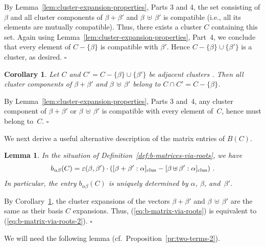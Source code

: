 \documentclass[letterpaper]{amsart}
\numberwithin{equation}{section}
\newtheorem{corollary}[theorem]{Corollary}
\newtheorem{lemma}[theorem]{Lemma}
\theoremstyle{definition}
\def\proof{\smallskip\noindent {\bf Proof.\ }}
\def\endproof{\hfill$\square$\medskip}
\def\subplus{{\,\uplus\,} }
\begin{document}
\proof 
By Lemma~\ref{lem:cluster-expansion-properties}, Parts 3 and 4, 
the set consisting of $\beta$ and all cluster components of 
$\beta + \beta'$ and $\beta \subplus \beta'$ is compatible 
(i.e., all its elements are mutually compatible). 
Thus, there exists a cluster $C$ containing this set. 
Again using Lemma~\ref{lem:cluster-expansion-properties}, Part~4, 
we conclude that every element of $C - \{\beta\}$ is compatible 
with $\beta'$. 
Hence  $C-\{\beta\}\cup\{\beta'\}$ is a cluster, as desired. 
\endproof 
 
\begin{corollary} 
\label{cor:cluster-components-lie-in-cluster} 
Let $C$ and $C'=C-\{\beta\}\cup\{\beta'\}$ be adjacent clusters . 
Then all cluster components of $\beta + \beta'$ and $\beta \subplus \beta'$ 
belong to $C\cap C'=C - \{\beta\}$. 
\end{corollary} 
 
 
\begin{proof} 
By Lemma~\ref{lem:cluster-expansion-properties}, Parts 3 and~4, 
any cluster component of  $\beta + \beta'$ or $\beta \subplus \beta'$ 
is compatible with every element of~$C$, 
hence must belong to~$C$. 
\end{proof} 
 
We next %
derive a useful alternative description of the matrix entries of $B(C)$. 
 
\begin{lemma} 
\label{lem:b-thru-cluster-expansion} 
In the situation of Definition~\ref{def:b-matrices-via-roots}, 
we have 
\begin{equation} 
\label{eq:b-matrix-via-roots-2} 
b_{\alpha\beta}(C) = \varepsilon(\beta,\beta') \cdot 
([\beta + \beta': \alpha]_{\rm clus} - 
[\beta \subplus \beta': \alpha]_{\rm clus}) \ . 
\end{equation} 
In particular, the entry $b_{\alpha\beta}(C)$ is uniquely 
determined by $\alpha$, $\beta$, and~$\beta'$. 
\end{lemma} 
 
\proof 
By Corollary~\ref{cor:cluster-components-lie-in-cluster}, 
the cluster expansions of the 
vectors $\beta + \beta'$ and $\beta \subplus \beta'$ 
are the same as their basis $C$ expansions. 
Thus, (\ref{eq:b-matrix-via-roots}) is equivalent to 
(\ref{eq:b-matrix-via-roots-2}). 
\endproof 
 
We will need the following lemma (cf.\ Proposition~\ref{pr:two-terms-2}). 
 
\end{document}
